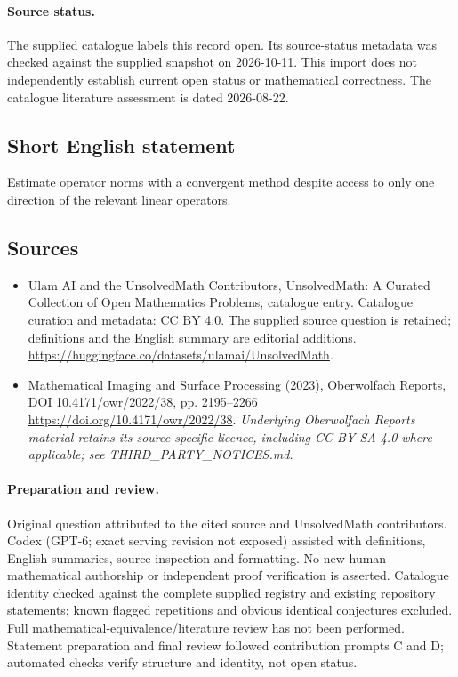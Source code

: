 \documentclass[11pt]{article}
\begin{document}
\paragraph{Source status.}
The supplied catalogue labels this record open. Its source-status metadata was checked against the supplied snapshot on 2026-10-11. This import does not independently establish current open status or mathematical correctness. The catalogue literature assessment is dated 2026-08-22.
\subsection{Short English statement}
Estimate operator norms with a convergent method despite access to only one direction of the relevant linear operators.
\subsection{Sources}
\begin{itemize}
\item[S1] Ulam AI and the UnsolvedMath Contributors, UnsolvedMath: A Curated Collection of Open Mathematics Problems, catalogue entry. Catalogue curation and metadata: CC BY 4.0. The supplied source question is retained; definitions and the English summary are editorial additions.
\url{https://huggingface.co/datasets/ulamai/UnsolvedMath}.
\item[S2] Mathematical Imaging and Surface Processing (2023), Oberwolfach Reports, DOI 10.4171/owr/2022/38, pp. 2195--2266
\url{https://doi.org/10.4171/owr/2022/38}.
\textit{Underlying Oberwolfach Reports material retains its source-specific licence, including CC BY-SA 4.0 where applicable; see THIRD\_PARTY\_NOTICES.md.}
\end{itemize}
\paragraph{Preparation and review.}
Original question attributed to the cited source and UnsolvedMath contributors. Codex (GPT-6; exact serving revision not exposed) assisted with definitions, English summaries, source inspection and formatting. No new human mathematical authorship or independent proof verification is asserted. Catalogue identity checked against the complete supplied registry and existing repository statements; known flagged repetitions and obvious identical conjectures excluded. Full mathematical-equivalence/literature review has not been performed. Statement preparation and final review followed contribution prompts C and D; automated checks verify structure and identity, not open status.
\label{end:statement}
\end{document}
